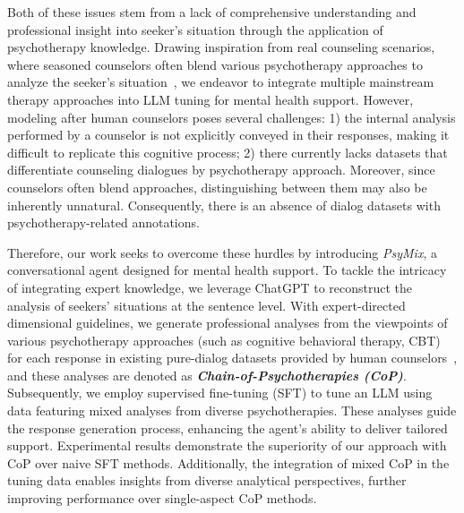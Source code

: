 Both of these issues stem from a lack of comprehensive understanding and professional insight into seeker's situation through the application of psychotherapy knowledge. 
Drawing inspiration from real counseling scenarios, where seasoned counselors often blend various psychotherapy approaches to analyze the seeker's situation~\cite{lee2023chain}, we endeavor to integrate multiple mainstream therapy approaches into LLM tuning for mental health support. 
However, modeling after human counselors poses several challenges: 1) the internal analysis performed by a counselor is not explicitly conveyed in their responses, making it difficult to replicate this cognitive process; 2) there currently lacks datasets that differentiate counseling dialogues by psychotherapy approach. Moreover, since counselors often blend approaches, distinguishing between them may also be inherently unnatural. Consequently, there is an absence of dialog datasets with psychotherapy-related annotations.


Therefore, our work seeks to overcome these hurdles by introducing \textit{PsyMix}, a conversational agent designed for mental health support. To tackle the intricacy of integrating expert knowledge, we leverage ChatGPT to reconstruct the analysis of seekers' situations at the sentence level. 
With expert-directed dimensional guidelines, we generate professional analyses from the viewpoints of various psychotherapy approaches (such as cognitive behavioral therapy, CBT) for each response in existing pure-dialog datasets provided by human counselors~\cite{li-etal-2023-understanding}, and these analyses are denoted as \textbf{\textit{Chain-of-Psychotherapies (CoP)}}. 
Subsequently, we employ supervised fine-tuning (SFT) to tune an LLM using data featuring mixed analyses from diverse psychotherapies. These analyses guide the response generation process, enhancing the agent's ability to deliver tailored support. Experimental results demonstrate the superiority of our approach with CoP over naive SFT methods. Additionally, the integration of mixed CoP in the tuning data enables insights from diverse analytical perspectives, further improving performance over single-aspect CoP methods.

